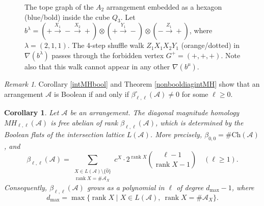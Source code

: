 \documentclass{amsart}
\numberwithin{equation}{section}
\newtheorem{cor}[thm]{Corollary}
\theoremstyle{plain}
\theoremstyle{remark}
\newtheorem{rem}[thm]{Remark}
\theoremstyle{definition}
\numberwithin{equation}{section}
\newcommand{\A}{\mathcal{A}}
\newcommand{\Ch}{\mathrm{Ch}}
\DeclareMathOperator{\rank}{rank}
\begin{document}
\begin{figure}[htbp]
\begin{tikzpicture}[x={(1.5cm,0cm)}, y={(0cm,1.5cm)}, z={(-0.6cm,-0.5cm)}]
    \end{tikzpicture}
    \caption{The tope graph of the $A_2$ arrangement embedded as a hexagon (blue/bold) inside the cube $Q_3$. Let $b^{\lambda}=(+\xrightarrow{X_1}-\xrightarrow{X_2}+)\otimes (+\xrightarrow{Y_1}-)\otimes (-\xrightarrow{Z_1} +)$, where $\lambda=(2,1,1)$. The 4-step shuffle walk $Z_1X_1X_2Y_1$ (orange/dotted) in $\nabla(b^\lambda)$ passes through the forbidden vertex $G^+=(+,+,+)$. Note also that this walk cannot appear in any other $\nabla(b^{\mu})$.}
    \label{fig:ghost_trap}
\end{figure}

\begin{rem}
    Corollary \ref{intMHbool} and Theorem \ref{nonbooldiagintMH} show that an arrangement $\A$ is Boolean if and only if $\beta_{\ell,\ell}^{\circ}(\A)\neq 0$ for some $\ell\geq 0$.
\end{rem}

\begin{cor}\label{diagbetti}
    Let $\A$ be an arrangement. The diagonal magnitude homology $MH_{\ell,\ell}(\A)$ is free abelian of rank $\beta_{\ell,\ell}(\A)$, which is determined by the Boolean flats of the intersection lattice $L(\A)$. More precisely, $\beta_{0,0}=\#\Ch(\A)$, and
    \[
    \beta_{\ell,\ell}(\A) = \sum_{\substack{X \in L(\A)\setminus\{\hat{0}\} \\ \rank X = \#\A_X}} c^X \cdot 2^{\rank X} \binom{\ell-1}{\rank X - 1}\quad (\ell\geq 1).
    \]
    Consequently, $\beta_{\ell,\ell}(\A)$ grows as a polynomial in $\ell$ of degree $d_{\max} - 1$, where
    \[
    d_{\max}=\max\{\rank X\mid X\in L(\A),\ \rank X=\#\A_X\}.
    \]
\end{cor}
\end{document}
